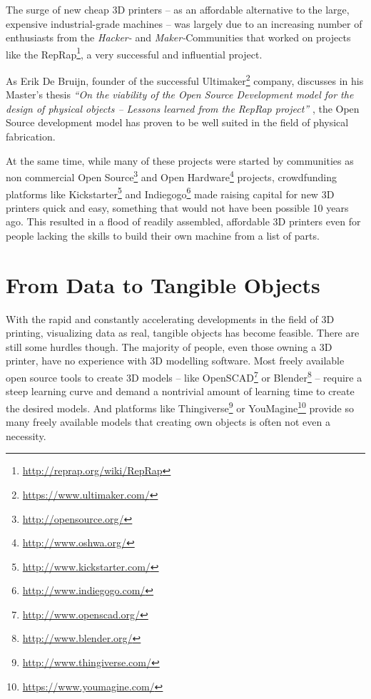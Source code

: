 
The surge of new cheap 3D printers -- as an affordable alternative to the large,
expensive industrial-grade machines -- was largely due to an increasing number
of enthusiasts from the \emph{Hacker-} and \emph{Maker-}Communities that worked
on projects like the RepRap\footnote{\url{http://reprap.org/wiki/RepRap}}, a
very successful and influential project.

As Erik De Bruijn, founder of the successful
Ultimaker\footnote{\url{https://www.ultimaker.com/}} company, discusses in his
Master's thesis \textit{``On the viability of the Open Source Development model
for the design of physical objects -- Lessons learned from the RepRap project''}
\cite{bruijn:2010}, the Open Source development model has proven to be well
suited in the field of physical fabrication.

At the same time, while many of these projects were started by communities as
non commercial Open Source\footnote{\url{http://opensource.org/}} and Open
Hardware\footnote{\url{http://www.oshwa.org/}} projects, crowdfunding platforms
like Kickstarter\footnote{\url{http://www.kickstarter.com/}} and
Indiegogo\footnote{\url{http://www.indiegogo.com/}} made raising capital for new
3D printers quick and easy, something that would not have been possible 10 years
ago. This resulted in a flood of readily assembled, affordable 3D printers even
for people lacking the skills to build their own machine from a list of parts.


\section{From Data to Tangible Objects}

With the rapid and constantly accelerating developments in the field of 3D
printing, visualizing data as real, tangible objects has become feasible. There
are still some hurdles though.  The majority of people, even those owning a 3D
printer, have no experience with 3D modelling software. Most freely available
open source tools to create 3D models -- like
OpenSCAD\footnote{\url{http://www.openscad.org/}} or
Blender\footnote{\url{http://www.blender.org/}} -- require a steep learning
curve and demand a nontrivial amount of learning time to create the desired
models. And platforms like
Thingiverse\footnote{\url{http://www.thingiverse.com/}} or
YouMagine\footnote{\url{https://www.youmagine.com/}} provide so many freely
available models that creating own objects is often not even a necessity.

